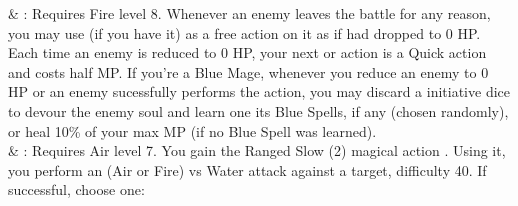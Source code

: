 \begin{tabjob}
     & %
    : Requires Fire level 8.  Whenever an enemy leaves the battle for any reason, you may use  (if you have it) as a free action on it as if had dropped to 0 HP. Each time an enemy is reduced to 0 HP, your next  or  action is a Quick action and costs half MP. If you're a Blue Mage, whenever you reduce an enemy to 0 HP or an enemy sucessfully performs the  action, you may discard a initiative dice to devour the enemy soul and learn one its Blue Spells, if any (chosen randomly), or heal 10\% of your max MP (if no Blue Spell was learned).  \\
     & %
    : Requires Air level 7. You gain the Ranged Slow (2) magical action . Using it, you perform an (Air or Fire) vs Water attack against a target, difficulty 40. If successful, choose one: \\
\end{tabjob}
